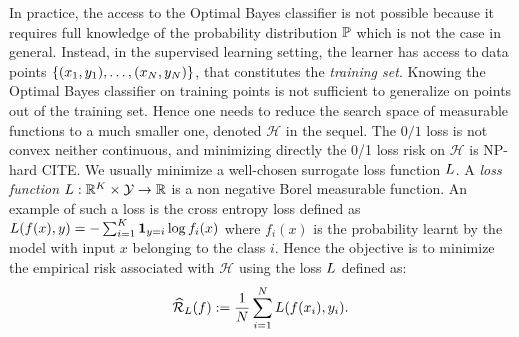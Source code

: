 In practice, the access to the Optimal Bayes  classifier is not possible because it requires full knowledge of the probability distribution $\mathbb{P}$ which is not the case in general. Instead, in the supervised learning setting, the learner has access to data points $\{(x_1,y_1),\dots,(x_N,y_N)\}$, that constitutes the \emph{training set}. Knowing the Optimal Bayes classifier on training points is not sufficient to generalize on points out of the training set. Hence one needs to reduce the search space of measurable functions to a much smaller one, denoted $\mathcal{H}$ in the sequel. The $0/1$ loss is not convex neither continuous, and minimizing directly the 0/1 loss risk  on $\mathcal{H}$ is  NP-hard CITE. We usually minimize a well-chosen surrogate loss function $L$. A \textit{loss function} $L:\mathbb{R}^K\times\mathcal{Y}\to\mathbb{R}$ is a non negative Borel measurable function. An example of such a loss is the cross entropy loss defined as $L(f(x),y)=-\sum_{i=1}^K \mathbf{1}_{y=i}\log f_i(x)$
where $f_i(x)$ is the probability learnt by the model with input $x$ belonging to the class $i$. Hence the objective is to minimize the empirical risk associated with $\mathcal{H}$ using the loss $L$  defined as:
\begin{align*}
\widehat{\mathcal{R}}_{L}(f):= \frac{1}{N}\sum_{i=1}^N L(f(x_i),y_i).
\end{align*}



